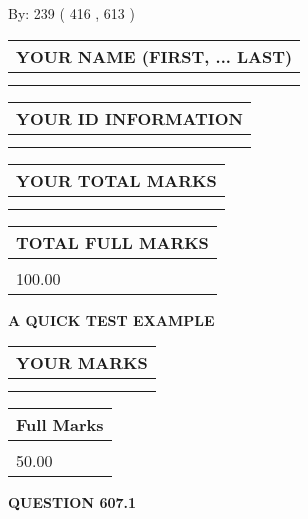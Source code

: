 \documentclass[12pt]{article}
\begin{document}
   
\hspace{1.0in} By: 
 239 ( 416 ,  613 )
   
   
   
   
\newpage 
\setcounter{page}{ 
   607001 } 
   
   
   
   
\noindent\begin{tabular}{|l|}
\hline
YOUR NAME (FIRST, ... LAST)  \\
\hline
 \\ 
 \\ 
\hline
\end{tabular}
\hspace{0.05in} \begin{tabular}{|l|}
\hline
 YOUR   ID   INFORMATION  \\
\hline
 \\ 
 \\ 
\hline
\end{tabular}
   
   
\vspace{0.2in}\noindent\begin{tabular}{|l|}
\hline
YOUR TOTAL MARKS  \\
\hline
 \\ 
 \\ 
\hline
\end{tabular}
\hspace{0.05in} \begin{tabular}{|l|}
\hline
TOTAL FULL MARKS  \\
\hline
 \\ 
100.00 \\
\hline
\end{tabular}
   
   
 \vspace{0.2in}
{\LARGE {\textbf{ A QUICK TEST EXAMPLE}}}
   
   
  
\vspace{0.2in}
  
\noindent\begin{tabular}{|l|}
\hline
 YOUR MARKS  \\
\hline
 \\ 
 \\ 
\hline
\end{tabular}
\hspace{0.05in} \begin{tabular}{|l|}
\hline
 Full Marks  \\
\hline
 \\ 
50.00 \\
\hline
\end{tabular}
{\textbf{\Large{QUESTION
607.1 
}}}
  
\end{document}
